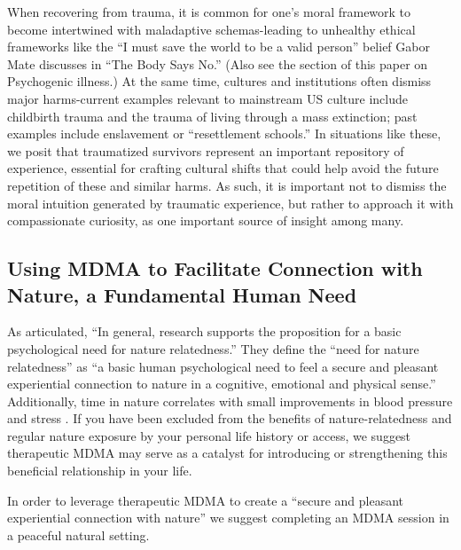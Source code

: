 \documentclass[12pt,letterpaper]{article}
\begin{document}
When recovering from trauma, it is common for one's moral framework to become intertwined with maladaptive schemas-leading to unhealthy ethical frameworks like the “I must save the world to be a valid person” belief Gabor Mate discusses in “The Body Says No.” (Also see the section\todo{} of this paper on Psychogenic illness.) At the same time, cultures and institutions often dismiss major harms-current examples relevant to mainstream US culture include childbirth trauma and the trauma of living through a mass extinction; past examples include enslavement or “resettlement schools.” In situations like these, we posit that traumatized survivors represent an important repository of experience, essential for crafting cultural shifts that could help avoid the future repetition of these and similar harms. As such, it is important not to dismiss the moral intuition generated by traumatic experience, but rather to approach it with compassionate curiosity, as one important source of insight among many. 

\subsection{Using MDMA to Facilitate Connection with Nature, a Fundamental Human Need}
\label{sec:nature}
As \textcite{baxterNatureRelatedness} articulated, “In general, research supports the proposition for a basic psychological need for nature relatedness.” They define the “need for nature relatedness” as “a basic human psychological need to feel a secure and pleasant experiential connection to nature in a cognitive, emotional and physical sense.” Additionally, time in nature correlates with small improvements in blood pressure and stress \cite{caoimheGreenspaceOutcomes}. If you have been excluded from the benefits of nature-relatedness and regular nature exposure by your personal life history or access, we suggest therapeutic MDMA may serve as a catalyst for introducing or strengthening this beneficial relationship in your life.

In order to leverage therapeutic MDMA to create a “secure and pleasant experiential connection with nature” we suggest completing an MDMA session in a peaceful natural setting.
\end{document}
